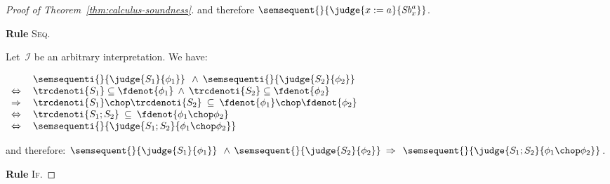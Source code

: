 \documentclass[a4paper,numberwithinsect]{lipics-v2021}
\begin{document}
\begin{proof}[Proof of Theorem~\ref{thm:calculus-soundness}]
  \noindent
  and therefore $\semsequent{}{\judge{x := a}{\mathit{Sb}^a_x}}$.

  \noindent\textbf{Rule} \textsc{Seq}.

  Let~$\mathcal{I}$ be an arbitrary interpretation.
  We have: %
  
  $
  \begin{array}{ll}
    & 
      \semsequenti{}{\judge{S_1}{\phi_1}} \>\>\wedge\>
      \semsequenti{}{\judge{S_2}{\phi_2}} \\
    \Leftrightarrow\> & 
                        \trcdenoti{S_1} \subseteq \fdenot{\phi_1} 
                        \>\wedge\>
                        \trcdenoti{S_2} \subseteq \fdenot{\phi_2} \\
    \Rightarrow & 
                  \trcdenoti{S_1} \chop \trcdenoti{S_2} \>\subseteq\>
                  \fdenot{\phi_1} \chop \fdenot{\phi_2} \\
    \Leftrightarrow & 
                      \trcdenoti{S_1 ; S_2} \>\subseteq\>
                      \fdenot{\phi_1 \chop \phi_2} \\
    \Leftrightarrow & 
                      \semsequenti{}{\judge{S_1; S_2}{\phi_1 \chop \phi_2}} 
  \end{array} $ %

  \noindent
  and therefore: 
  $ \semsequent{}{\judge{S_1}{\phi_1}} \>\>\wedge\,
  \semsequent{}{\judge{S_2}{\phi_2}}
  \>\Rightarrow\>\>
  \semsequent{}{\judge{S_1; S_2}{\phi_1 \chop \phi_2}} $.
  \fi

  \noindent\textbf{Rule} \textsc{If}.


\end{proof}
\end{document}
